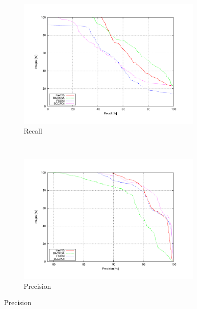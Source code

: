 \begin{figure}[t]
        \centering
        \begin{subfigure}[b]{0.5\textwidth}
                \centering
                \includegraphics[width=\textwidth, trim=50 40 80 50,clip]{fig9.pdf}
                \caption{Recall}
                \label{fig:cp02_recallChart}
        \end{subfigure}%
        ~ %
        \begin{subfigure}[b]{0.5\textwidth}
                \centering
                \includegraphics[width=\textwidth, trim=50 40 80 50,clip]{fig10.pdf}
                \caption{Precision}
                \label{fig:cp02_precisionChart}
        \end{subfigure}%
        

\end{figure}
